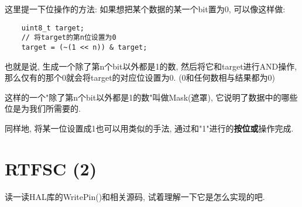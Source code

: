 这里提一下位操作的方法: 如果想把某个数据的某一个bit置为0, 可以像这样做:
\begin{lstlisting}
	uint8_t target;
	// 将target的第n位设置为0
	target = (~(1 << n)) & target;
\end{lstlisting}

也就是说, 生成一个除了第n个bit以外都是1的数, 然后将它和target进行AND操作, 那么仅有的那个0就会将target的对应位设置为0. (0和任何数相与结果都为0)

这样的一个"除了第n个bit以外都是1的数"叫做Mask(遮罩), 它说明了数据中的哪些位是为我们所需要的.

同样地, 将某一位设置成1也可以用类似的手法, 通过和"1"进行的\textbf{按位或}操作完成.


\section{RTFSC (2)}
读一读HAL库的WritePin()和相关源码, 试着理解一下它是怎么实现的吧.
